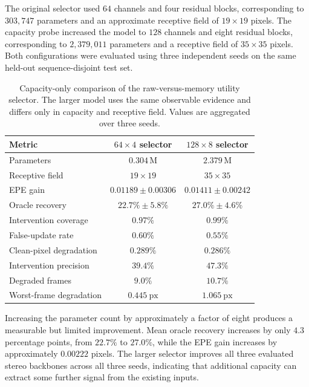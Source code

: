 \documentclass[11pt,a4paper]{article}
\begin{document}
The original selector used \(64\) channels and four residual blocks, corresponding to
\(303{,}747\) parameters and an approximate receptive field of \(19\times19\) pixels.
The capacity probe increased the model to \(128\) channels and eight residual blocks,
corresponding to \(2{,}379{,}011\) parameters and a receptive field of \(35\times35\)
pixels. Both configurations were evaluated using three independent seeds on the same
held-out sequence-disjoint test set.

\begin{table}[t]
    \centering
    \caption{Capacity-only comparison of the raw-versus-memory utility selector.
    The larger model uses the same observable evidence and differs only in capacity
    and receptive field. Values are aggregated over three seeds.}
    \label{tab:capacity_probe}
    \begin{tabular}{lcc}
        \toprule
        Metric & \(64\times4\) selector & \(128\times8\) selector \\
        \midrule
        Parameters
            & \(0.304\,\mathrm{M}\)
            & \(2.379\,\mathrm{M}\) \\
        Receptive field
            & \(19\times19\)
            & \(35\times35\) \\
        EPE gain
            & \(0.01189 \pm 0.00306\)
            & \(0.01411 \pm 0.00242\) \\
        Oracle recovery
            & \(22.7\% \pm 5.8\%\)
            & \(27.0\% \pm 4.6\%\) \\
        Intervention coverage
            & \(0.97\%\)
            & \(0.99\%\) \\
        False-update rate
            & \(0.60\%\)
            & \(0.55\%\) \\
        Clean-pixel degradation
            & \(0.289\%\)
            & \(0.286\%\) \\
        Intervention precision
            & \(39.4\%\)
            & \(47.3\%\) \\
        Degraded frames
            & \(9.0\%\)
            & \(10.7\%\) \\
        Worst-frame degradation
            & \(0.445\ \mathrm{px}\)
            & \(1.065\ \mathrm{px}\) \\
        \bottomrule
    \end{tabular}
\end{table}

Increasing the parameter count by approximately a factor of eight produces a measurable
but limited improvement. Mean oracle recovery increases by only \(4.3\) percentage
points, from \(22.7\%\) to \(27.0\%\), while the EPE gain increases by approximately
\(0.00222\) pixels. The larger selector improves all three evaluated stereo backbones
across all three seeds, indicating that additional capacity can extract some further
signal from the existing inputs.
\end{document}
